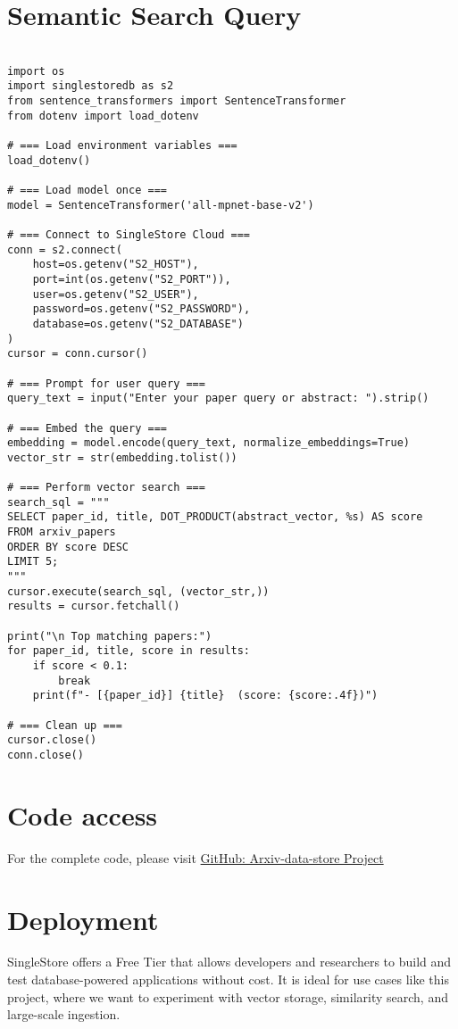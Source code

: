 \documentclass[11pt]{article}
\begin{document}
\section{Semantic Search Query}
\label{sec:org1f12cf8}

\begin{verbatim}

import os
import singlestoredb as s2
from sentence_transformers import SentenceTransformer
from dotenv import load_dotenv

# === Load environment variables ===
load_dotenv()

# === Load model once ===
model = SentenceTransformer('all-mpnet-base-v2')

# === Connect to SingleStore Cloud ===
conn = s2.connect(
    host=os.getenv("S2_HOST"),
    port=int(os.getenv("S2_PORT")),
    user=os.getenv("S2_USER"),
    password=os.getenv("S2_PASSWORD"),
    database=os.getenv("S2_DATABASE")
)
cursor = conn.cursor()

# === Prompt for user query ===
query_text = input("Enter your paper query or abstract: ").strip()

# === Embed the query ===
embedding = model.encode(query_text, normalize_embeddings=True)
vector_str = str(embedding.tolist())

# === Perform vector search ===
search_sql = """
SELECT paper_id, title, DOT_PRODUCT(abstract_vector, %s) AS score
FROM arxiv_papers
ORDER BY score DESC
LIMIT 5;
"""
cursor.execute(search_sql, (vector_str,))
results = cursor.fetchall()

print("\n Top matching papers:")
for paper_id, title, score in results:
    if score < 0.1:
        break
    print(f"- [{paper_id}] {title}  (score: {score:.4f})")

# === Clean up ===
cursor.close()
conn.close()

\end{verbatim}
\section{Code access}
\label{sec:org4097a3c}

For the complete code, please visit \href{https://github.com/rvishravars/analytics/tree/main/Arxiv-data-store}{GitHub: Arxiv-data-store Project}
\section{Deployment}
\label{sec:org2342d67}

SingleStore offers a Free Tier that allows developers and researchers to build and test database-powered applications without cost. It is ideal for use cases like this project, where we want to experiment with vector storage, similarity search, and large-scale ingestion.
\end{document}
